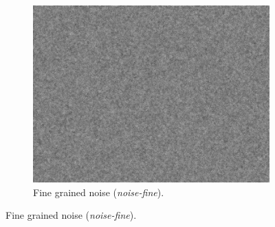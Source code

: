 \begin{figure}
{\begin{subfigure}{0.3\textwidth}
      \includegraphics[width=\textwidth]{../data/synth003.jpg}
      \caption{Fine grained noise (\emph{noise-fine}).}
      \label{fig:synth-c}
    \end{subfigure}
  } %


\end{figure}
